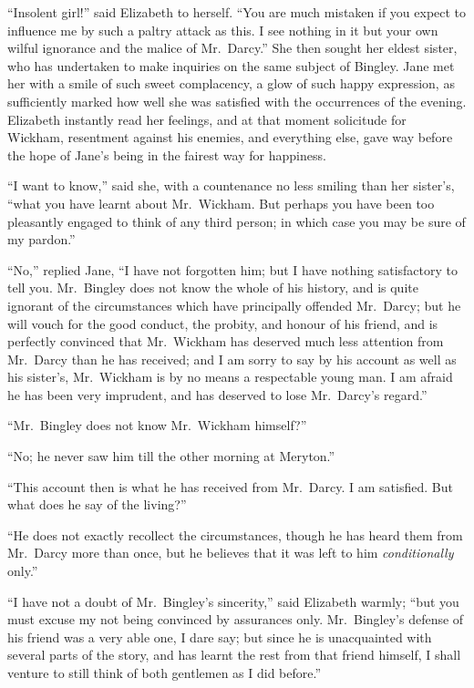 ``Insolent girl!'' said Elizabeth to herself.  ``You are much
mistaken if you expect to influence me by such a paltry attack
as this.  I see nothing in it but your own wilful ignorance and
the malice of Mr.\ Darcy.''  She then sought her eldest sister, who
has undertaken to make inquiries on the same subject of Bingley.
Jane met her with a smile of such sweet complacency, a glow of
such happy expression, as sufficiently marked how well she was
satisfied with the occurrences of the evening.  Elizabeth instantly
read her feelings, and at that moment solicitude for Wickham,
resentment against his enemies, and everything else, gave way
before the hope of Jane's being in the fairest way for happiness.

``I want to know,'' said she, with a countenance no less smiling
than her sister's, ``what you have learnt about Mr.\ Wickham.
But perhaps you have been too pleasantly engaged to think of
any third person; in which case you may be sure of my pardon.''

``No,'' replied Jane, ``I have not forgotten him; but I have nothing
satisfactory to tell you.  Mr.\ Bingley does not know the whole of
his history, and is quite ignorant of the circumstances which have
principally offended Mr.\ Darcy; but he will vouch for the good
conduct, the probity, and honour of his friend, and is perfectly
convinced that Mr.\ Wickham has deserved much less attention
from Mr.\ Darcy than he has received; and I am sorry to say by
his account as well as his sister's, Mr.\ Wickham is by no means a
respectable young man.  I am afraid he has been very imprudent,
and has deserved to lose Mr.\ Darcy's regard.''

``Mr.\ Bingley does not know Mr.\ Wickham himself?''

``No; he never saw him till the other morning at Meryton.''

``This account then is what he has received from Mr.\ Darcy.
I am satisfied.  But what does he say of the living?''

``He does not exactly recollect the circumstances, though he has
heard them from Mr.\ Darcy more than once, but he believes that
it was left to him \emph{conditionally} only.''

``I have not a doubt of Mr.\ Bingley's sincerity,'' said Elizabeth
warmly; ``but you must excuse my not being convinced by
assurances only.  Mr.\ Bingley's defense of his friend was a very
able one, I dare say; but since he is unacquainted with several
parts of the story, and has learnt the rest from that friend
himself, I shall venture to still think of both gentlemen as I
did before.''

